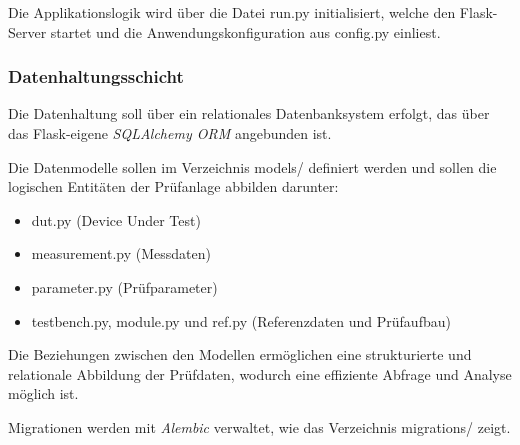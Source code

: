 Die Applikationslogik wird über die Datei run.py initialisiert, welche den Flask-Server startet und die Anwendungskonfiguration aus config.py einliest.


\subsubsection{Datenhaltungsschicht}

Die Datenhaltung soll  über ein relationales Datenbanksystem erfolgt, das über das Flask-eigene \textit{SQLAlchemy ORM} angebunden ist.

Die Datenmodelle sollen im Verzeichnis models/ definiert werden und sollen die logischen Entitäten der Prüfanlage abbilden darunter:

\begin{itemize}

\item
dut.py (Device Under Test)

\item
measurement.py (Messdaten)

\item
parameter.py (Prüfparameter)

\item
testbench.py, module.py und ref.py (Referenzdaten und Prüfaufbau)

\end{itemize}

Die Beziehungen zwischen den Modellen ermöglichen eine strukturierte und relationale Abbildung der Prüfdaten, wodurch eine effiziente Abfrage und Analyse möglich ist.

Migrationen werden mit \textit{Alembic} verwaltet, wie das Verzeichnis migrations/ zeigt.











